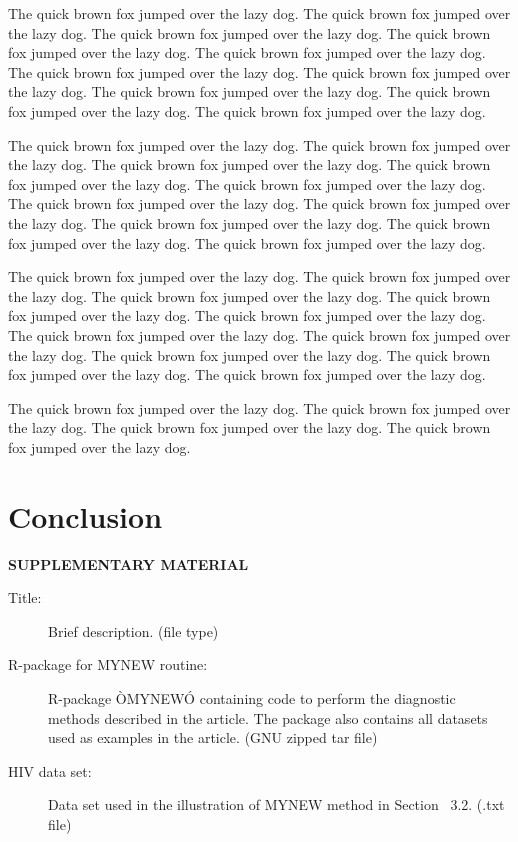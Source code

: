 \documentclass[12pt]{article}
\begin{document}
The quick brown fox jumped over the lazy dog.
The quick brown fox jumped over the lazy dog.
The quick brown fox jumped over the lazy dog.
The quick brown fox jumped over the lazy dog.
The quick brown fox jumped over the lazy dog.
The quick brown fox jumped over the lazy dog.
The quick brown fox jumped over the lazy dog.
The quick brown fox jumped over the lazy dog.
The quick brown fox jumped over the lazy dog.
The quick brown fox jumped over the lazy dog.

The quick brown fox jumped over the lazy dog.
The quick brown fox jumped over the lazy dog.
The quick brown fox jumped over the lazy dog.
The quick brown fox jumped over the lazy dog.
The quick brown fox jumped over the lazy dog.
The quick brown fox jumped over the lazy dog.
The quick brown fox jumped over the lazy dog.
The quick brown fox jumped over the lazy dog.
The quick brown fox jumped over the lazy dog.
The quick brown fox jumped over the lazy dog.

The quick brown fox jumped over the lazy dog.
The quick brown fox jumped over the lazy dog.
The quick brown fox jumped over the lazy dog.
The quick brown fox jumped over the lazy dog.
The quick brown fox jumped over the lazy dog.
The quick brown fox jumped over the lazy dog.
The quick brown fox jumped over the lazy dog.
The quick brown fox jumped over the lazy dog.
The quick brown fox jumped over the lazy dog.
The quick brown fox jumped over the lazy dog.

The quick brown fox jumped over the lazy dog.
The quick brown fox jumped over the lazy dog.
The quick brown fox jumped over the lazy dog.
The quick brown fox jumped over the lazy dog.



\section{Conclusion}
\label{sec:conc}


\bigskip
\begin{center}
{\large\bf SUPPLEMENTARY MATERIAL}
\end{center}

\begin{description}

\item[Title:] Brief description. (file type)

\item[R-package for  MYNEW routine:] R-package ÒMYNEWÓ containing code to perform the diagnostic methods described in the article. The package also contains all datasets used as examples in the article. (GNU zipped tar file)

\item[HIV data set:] Data set used in the illustration of MYNEW method in Section~ 3.2. (.txt file)

\end{description}
\end{document}
